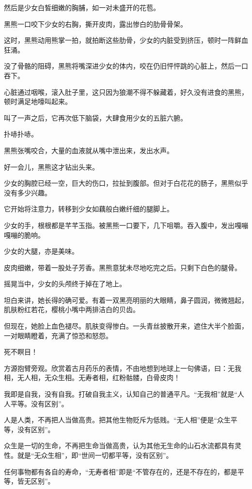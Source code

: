 \begin{this_body}
然后是少女白皙细嫩的胸脯，如一对未盛开的花苞。

黑熊一口咬下少女的右胸，撕开皮肉，露出惨白的肋骨骨架。

这时，黑熊动用熊掌一拍，就拍断这些肋骨，少女的内脏受到挤压，顿时一阵鲜血狂涌。

没了骨骼的阻碍，黑熊将嘴深进少女的体内，咬在仍旧怦怦跳的心脏上，然后一口吞下。

心脏通过咽喉，滚入肚子里，这只因为狼潮不得不躲藏着，好久没有进食的黑熊，顿时满足地嚎叫起来。

叫了一声之后，它再次低下脑袋，大肆食用少女的五脏六腑。

扑哧扑哧。

黑熊张嘴咬合，大量的血液就从嘴中泄出来，发出水声。

好一会儿，黑熊这才钻出头来。

少女的胸腔已经一空，巨大的伤口，拉扯到腹部。但对于白花花的肠子，黑熊似乎没有多少兴趣。

它开始将注意力，转移到少女如藕般白嫩纤细的腿脚上。

少女的手，根根都是芊芊玉指。被黑熊一口要下，几下咀嚼。吞入腹中，发出嘎嘣嘎嘣的脆响。

少女的大腿，亦是美味。

皮肉细嫩，带着一股处子芳香。黑熊意犹未尽地吃完之后。只剩下白色的腿骨。

摇晃当中，少女的头颅终于掉在了地上。

坦白来讲，她长得的确可爱。有着一双黑亮明丽的大眼睛，鼻子圆润，微微翘起，肌肤粉红若花，樱桃小嘴中两排洁白的贝齿。

但现在，她脸上血色褪尽。肌肤变得惨白。一头青丝披散开来，遮住大半个脸面，一对眼睛瞪着，充满了惊恐和怒怨。

死不瞑目！

方源抱臂旁观。欣赏着古月药乐的表情，不由地想到地球上一句佛语，曰：无我相，无人相，无众生相。无寿者相，红粉骷髅，白骨皮肉！

我即是自我，没有自我。打破自我主义，认知自己的普通平凡。“无我相”就是“人人平等。没有区别”。

人是人类，不再把人当做高贵。把其他生物贬斥为低贱。“无人相”便是“众生平等，没有区别”。

众生是一切的生命，不再把生命当做高贵，认为其他无生命的山石水流都具有灵性。就是“无众生相”，即“世间一切都平等，没有区别”。

任何事物都有各自的寿命，“无寿者相”即是“不管存在的，还是不存在的，都是平等，皆无区别”。


\end{this_body}
